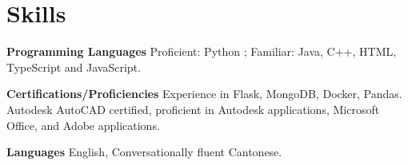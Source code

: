 \documentclass[letterpaper,12pt]{article}
\newcommand{\resumeSubHeadingListStart}{\begin{itemize}[leftmargin=0.15in, label={}]}
\newcommand{\resumeSubHeadingListEnd}{\end{itemize}}
\begin{document}
\section{Skills}
  \vspace{4pt}
  \resumeSubHeadingListStart
    \small{\item{
        \textbf{Programming Languages}{ Proficient: Python ; Familiar: Java, C++, HTML, TypeScript and JavaScript.} \\ \vspace{3pt}
        
        \textbf{Certifications/Proficiencies}{ Experience in Flask, MongoDB, Docker, Pandas. Autodesk AutoCAD certified, proficient in Autodesk applications, Microsoft Office, and Adobe applications. } \\ \vspace{3pt}
        
        \textbf{Languages}{ English, Conversationally fluent Cantonese.}
        
    }}
  \resumeSubHeadingListEnd



\end{document}
